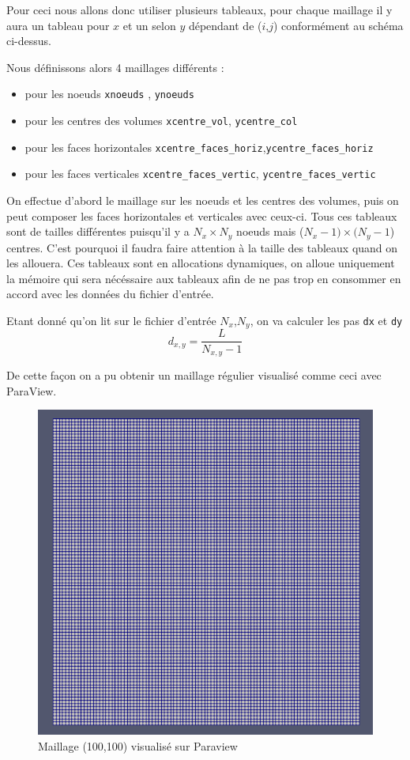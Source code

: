 \documentclass[a4paper,oneside]{article}
\makeatletter
\def\bigcenter{\trivlist \bigcentering\item\relax}
\def\bigcentering{\let\\\@centercr\rightskip\@bigflushglue%
\leftskip\@bigflushglue
\parindent\z@\parfillskip\z@skip}
\makeatother
\begin{document}
Pour ceci nous allons donc utiliser plusieurs tableaux, pour chaque maillage il y aura un tableau pour $x$ et un selon $y$ dépendant de ($i$,$j$) conformément au schéma ci-dessus.

Nous définissons alors 4 maillages différents :
\begin{itemize}
	\item pour les noeuds \verb?xnoeuds? , \verb?ynoeuds?
	\item pour les centres des volumes \verb?xcentre_vol?, \verb?ycentre_col?
	\item pour les faces horizontales \verb?xcentre_faces_horiz?,\verb?ycentre_faces_horiz?
	\item pour les faces verticales \verb?xcentre_faces_vertic?, \verb?ycentre_faces_vertic?
\end{itemize}

On effectue d'abord le maillage sur les noeuds et les centres des volumes, puis on peut composer les faces horizontales et verticales avec ceux-ci.
Tous ces tableaux sont de tailles différentes puisqu'il y a $N_x \times N_y$ noeuds mais ($N_x -1 )\times (N_y -1$) centres.
C'est pourquoi il faudra faire attention à la taille des tableaux quand on les allouera.
Ces tableaux sont en allocations dynamiques, on alloue uniquement la mémoire qui sera nécéssaire aux tableaux afin de ne pas trop en consommer en accord avec les données du fichier d'entrée. 


Etant donné qu'on lit sur le fichier d'entrée $N_x$,$N_y$, on va calculer les pas \verb?dx? et \verb?dy? 
\[
 d_{x,y} = \frac{L}{N_{x,y} -1}
\]

De cette façon on a pu obtenir un maillage régulier visualisé comme ceci avec ParaView.

\begin{figure}[h!]
\bigcenter
\includegraphics[scale=0.4]{Champ_Vitesse_Maillage/maillage100100.PNG}
\caption{Maillage (100,100) visualisé sur Paraview}
\end{figure}
\end{document}

